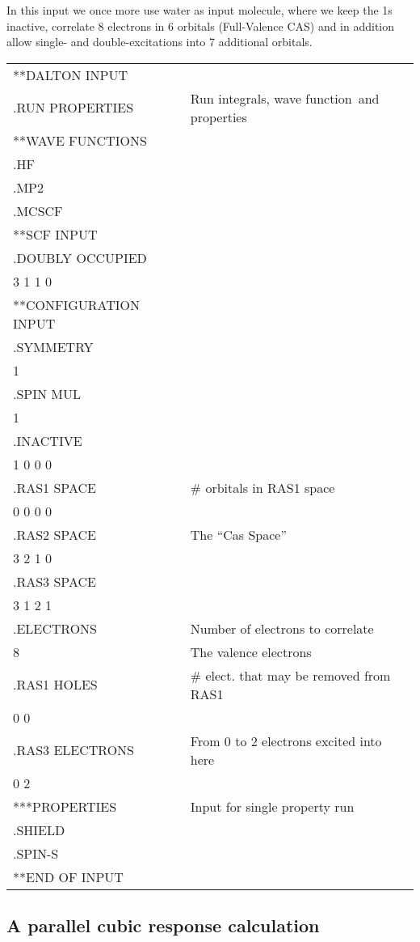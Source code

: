 In this input we once more use water as input molecule,
where we keep
the 1s inactive, correlate 8 electrons in 6 orbitals (Full-Valence
CAS) and in addition allow single- and double-excitations into
7 additional orbitals.

{\ttfamily
\begin{tabular}{ll}
**DALTON INPUT\\
.RUN PROPERTIES\hspace{2cm} & Run integrals, wave function\ and properties\\
**WAVE FUNCTIONS\\
.HF\\
.MP2\\
.MCSCF\\
**SCF INPUT\\
.DOUBLY OCCUPIED\\
 3 1 1 0\\
**CONFIGURATION INPUT\\
.SYMMETRY\\
 1\\
.SPIN MUL\\
 1\\
.INACTIVE\\
 1 0 0 0\\
.RAS1 SPACE & \# orbitals in RAS1 space\\
 0 0 0 0\\
.RAS2 SPACE & The ``Cas Space''\\
 3 2 1 0\\
.RAS3 SPACE\\
 3 1 2 1\\
.ELECTRONS  & Number of electrons to correlate\\
 8 & The valence electrons\\
.RAS1 HOLES & \# elect. that may be removed from RAS1\\
 0 0\\
.RAS3 ELECTRONS & From 0 to 2 electrons excited into here\\
 0 2\\
***PROPERTIES & Input for single property run\\
.SHIELD\\
.SPIN-S\\
**END OF INPUT\\
\end{tabular}}

\subsection{A parallel cubic response calculation}

